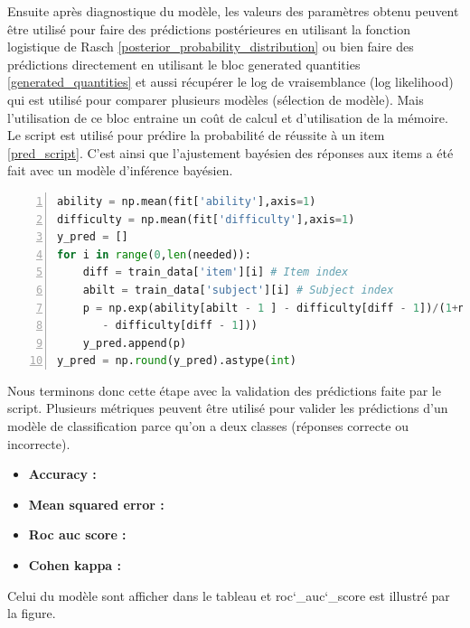 Ensuite après diagnostique du modèle, les valeurs des paramètres obtenu peuvent être utilisé pour faire des prédictions postérieures en utilisant la fonction logistique de Rasch \ref{posterior_probability_distribution} ou bien faire des prédictions directement en utilisant le bloc generated quantities \ref{generated_quantities} et aussi récupérer le log de vraisemblance (log likelihood) qui est utilisé pour comparer plusieurs modèles (sélection de modèle). Mais l’utilisation de ce bloc entraine un coût de calcul et d'utilisation de la mémoire. Le script est utilisé pour prédire la probabilité de réussite à un item \ref{pred_script}. C’est ainsi que l’ajustement bayésien des réponses aux items a été fait avec un modèle d’inférence bayésien.

\begin{lstlisting}[language=Python,label={pred_script},stringstyle=\color{deepgreen},basicstyle=\scriptsize, frame=l,framesep=4.5mm,framexleftmargin=2.5mm,tabsize=2,numbers=left,fillcolor=\color{blueforest!70},rulecolor=\color{blueforest},numberstyle=\normalfont\tiny\color{white}]
ability = np.mean(fit['ability'],axis=1)
difficulty = np.mean(fit['difficulty'],axis=1)
y_pred = []
for i in range(0,len(needed)):
	diff = train_data['item'][i] # Item index
	abilt = train_data['subject'][i] # Subject index
	p = np.exp(ability[abilt - 1 ] - difficulty[diff - 1])/(1+np.exp(ability[abilt - 1] 
	   - difficulty[diff - 1]))
	y_pred.append(p)
y_pred = np.round(y_pred).astype(int)
\end{lstlisting}

Nous terminons donc cette étape avec la validation des prédictions faite par le script. Plusieurs métriques peuvent être utilisé pour valider les prédictions d’un modèle de classification parce qu’on a deux classes (réponses correcte ou incorrecte).

\begin{itemize}
	\item \textbf{Accuracy :}
	\item \textbf{Mean squared error :}
	\item \textbf{Roc auc score :}
	\item \textbf{Cohen kappa :}	
\end{itemize}
Celui du modèle sont afficher dans le tableau et roc\char`_auc\char`_score est illustré par la figure.


